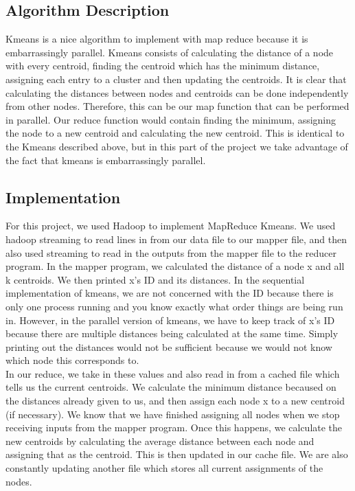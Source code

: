 \documentclass[paper=letter, fontsize=11pt]{article}
\numberwithin{equation}{section}		%
\numberwithin{figure}{section}			%
\numberwithin{table}{section}				%
\begin{document}
\subsection{Algorithm Description}
Kmeans is a nice algorithm to implement with map reduce because it is embarrassingly parallel. Kmeans consists of calculating the distance of a node with every centroid, finding the centroid which has the minimum distance, assigning each entry to a cluster and then updating the centroids. It is clear that calculating the distances between nodes and centroids can be done independently from other nodes. Therefore, this can be our map function that can be performed in parallel. Our reduce function would contain finding the minimum, assigning the node to a new centroid and calculating the new centroid. This is identical to the Kmeans described above, but in this part of the project we take advantage of the fact that kmeans is embarrassingly parallel.
\subsection{Implementation}
For this project, we used Hadoop to implement MapReduce Kmeans. We used hadoop streaming to read lines in from our data file to our mapper file, and then also used streaming to read in the outputs from the mapper file to the reducer program. In the mapper program, we calculated the distance of a node x and all k centroids. We then printed x's ID and its distances. In the sequential implementation of kmeans, we are not concerned with the ID because there is only one process running and you know exactly what order things are being run in. However, in the parallel version of kmeans, we have to keep track of x's ID because there are multiple distances being calculated at the same time. Simply printing out the distances would not be sufficient because we would not know which node this corresponds to. \\

In our reduce, we take in these values and also read in from a cached file which tells us the current centroids. We calculate the minimum distance becaused on the distances already given to us, and then assign each node x to a new centroid (if necessary). We know that we have finished assigning all nodes when we stop receiving inputs from the mapper program. Once this happens, we calculate the new centroids by calculating the average distance between each node and assigning that as the centroid. This is then updated in our cache file. We are also constantly updating another file which stores all current assignments of the nodes. 
\end{document}

